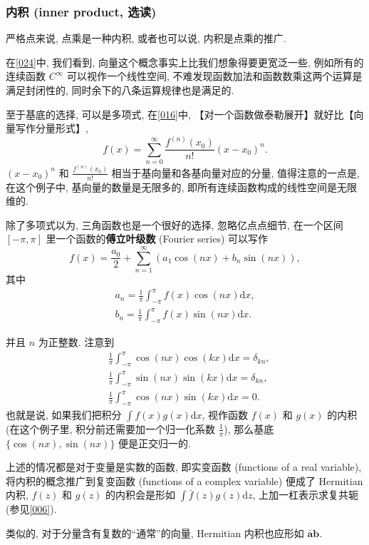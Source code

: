 \subsubsection{内积 (inner product, 选读)}

严格点来说, 点乘是一种内积, 或者也可以说, 内积是点乘的推广.

在\ref{024}中, 我们看到, 向量这个概念事实上比我们想象得要更宽泛一些,
例如所有的连续函数 $C^\infty$ 可以视作一个线性空间,
不难发现函数加法和函数数乘这两个运算是满足封闭性的,
同时余下的八条运算规律也是满足的.

至于基底的选择, 可以是多项式, 在\ref{016}中,
【对一个函数做泰勒展开】就好比【向量写作分量形式】, \[
f(x)=\sum_{n=0}^\infty\frac{f^{(n)}(x_0)}{n!}(x-x_0)^n.
\] $(x-x_0)^n$ 和 $\frac{f^{(n)}(x_0)}{n!} $
相当于基向量和各基向量对应的分量, 值得注意的一点是, 在这个例子中,
基向量的数量是无限多的, 即所有连续函数构成的线性空间是无限维的.

除了多项式以为, 三角函数也是一个很好的选择, 忽略亿点点细节, 在一个区间
$[-\pi,\pi]$ 里一个函数的\textbf{傅立叶级数} (Fourier series) 可以写作
\[
f(x)=\frac{a_0}{2}+\sum_{n=1}^\infty\left(a_1\cos(nx)+b_n\sin(nx)\right),
\] 其中 \[
\begin{aligned}
a_n=\frac{1}{\pi}\int_{-\pi}^\pi f(x)\cos(nx)\mathrm{d}x,\\
b_n=\frac{1}{\pi}\int_{-\pi}^\pi f(x)\sin(nx)\mathrm{d}x.
\end{aligned}
\]

并且 $n$ 为正整数. 注意到 \[
\begin{aligned}
&\frac{1}{\pi}\int_{-\pi}^{\pi}\cos(nx)\cos(kx)\mathrm{d}x=\delta_{kn},\\
&\frac{1}{\pi}\int_{-\pi}^{\pi}\sin(nx)\sin(kx)\mathrm{d}x=\delta_{kn},\\
&\frac{1}{\pi}\int _{-\pi}^{\pi}\cos(nx)\sin(kx)\mathrm{d}x=0.
\end{aligned}
\] 也就是说, 如果我们把积分 $\int f(x)g(x)\mathrm{d}x$, 视作函数
$f(x)$ 和 $g(x)$ 的内积 (在这个例子里, 积分前还需要加一个归一化系数
$\frac{1}{\pi}$), 那么基底 $\{\cos(nx),\sin(nx)\}$ 便是正交归一的.

\begin{newquote}
上述的情况都是对于变量是实数的函数, 即实变函数 (functions of a real
variable), 将内积的概念推广到复变函数 (functions of a complex variable)
便成了 Hermitian 内积, $f(z)$ 和 $g(z)$ 的内积会是形如
$\int\bar{f}(z)g(z)\mathrm{d}z$, 上加一杠表示求复共轭 (参见\ref{006}).

类似的, 对于分量含有复数的``通常''的向量, Hermitian 内积也应形如
$\bar{\boldsymbol{a}}\boldsymbol{b}$.
\end{newquote}

